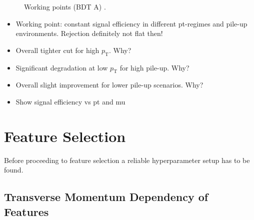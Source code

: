 \begin{figure}[ht]
\begin{subfigure}[t]{0.48\textwidth}
  \end{subfigure}
  \caption{Working points (BDT A) .
    }
\end{figure}


\begin{itemize}
\item Working point: constant signal efficiency in different pt-regimes and
  pile-up environments. Rejection definitely not flat then!
\item Overall tighter cut for high $p_\text{T}$. Why?
\item Significant degradation at low $p_\text{T}$ for high pile-up. Why?
\item Overall slight improvement for lower pile-up scenarios. Why?
\item Show signal efficiency vs pt and mu
\end{itemize}

\section{Feature Selection}
\label{sec:bdt_feature_selection}
Before proceeding to feature selection a reliable hyperparameter setup has to be
found.
\subsection{Transverse Momentum Dependency of Features}
\label{sec:bdt_incl_pt}

